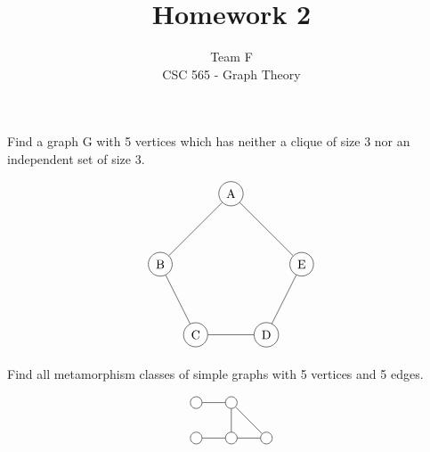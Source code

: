 \documentclass[12pt]{article}
\newenvironment{question}[2][Question]{\begin{trivlist}
\item[\hskip \labelsep {\bfseries #1}\hskip \labelsep {\bfseries #2.}]}{\end{trivlist}}
\begin{document}


\title{Homework 2}%
\author{Team F\\ %
CSC 565 - Graph Theory} %

\maketitle

\begin{question}{1}
Find a graph G with 5 vertices which has neither a clique of size 3 nor an independent set of size 3.
\end{question}

\begin{align*}
\begin{tikzpicture}
    \node[shape=circle,draw=black] (C) at (1,0) {C};
    \node[shape=circle,draw=black] (B) at (0,2) {B};
    \node[shape=circle,draw=black] (A) at (2,4) {A};
    \node[shape=circle,draw=black] (D) at (3,0) {D};
    \node[shape=circle,draw=black] (E) at (4,2) {E};
    \path [] (A) edge node[left] {} (B);
    \path [] (B) edge node[left] {} (C);
    \path [] (C) edge node[left] {} (D);
    \path [] (D) edge node[left] {} (E);
    \path [] (E) edge node[left] {} (A);
\end{tikzpicture}
\end{align*}


\begin{question}{2}
	Find all metamorphism classes of simple graphs with 5 vertices and 5 edges.
\end{question}


\begin{align*}
\begin{tikzpicture}
\node[shape=circle,draw=black] (A) at (0,0) {};
\node[shape=circle,draw=black] (B) at (1,0) {};
\node[shape=circle,draw=black] (C) at (0,-1) {};
\node[shape=circle,draw=black] (D) at (1,-1) {};
\node[shape=circle,draw=black] (E) at (2,-1) {};
\path [] (A) edge node[left] {} (B);
\path [] (C) edge node[left] {} (D);
\path [] (B) edge node[left] {} (D);
\path [] (B) edge node[left] {} (E);
\path [] (D) edge node[left] {} (E);
\end{tikzpicture}
\end{align*}
\end{document}
